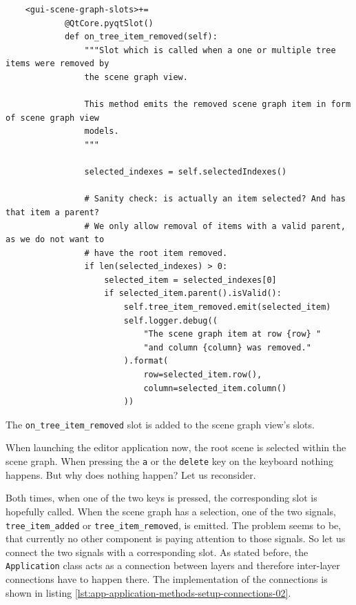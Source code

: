 \documentclass[10pt, openright, notitlepage]{scrreprt}
\begin{document}
\begin{listing}[H]
\begin{verbatim}
    <gui-scene-graph-slots>+=
            @QtCore.pyqtSlot()
            def on_tree_item_removed(self):
                """Slot which is called when a one or multiple tree items were removed by
                the scene graph view.
            
                This method emits the removed scene graph item in form of scene graph view
                models.
                """
            
                selected_indexes = self.selectedIndexes()
            
                # Sanity check: is actually an item selected? And has that item a parent?
                # We only allow removal of items with a valid parent, as we do not want to
                # have the root item removed.
                if len(selected_indexes) > 0:
                    selected_item = selected_indexes[0]
                    if selected_item.parent().isValid():
                        self.tree_item_removed.emit(selected_item)
                        self.logger.debug((
                            "The scene graph item at row {row} "
                            "and column {column} was removed."
                        ).format(
                            row=selected_item.row(),
                            column=selected_item.column()
                        ))
\end{verbatim}
\caption{\label{lst:gui-scene-graph-slots-on-tree-item-removed}
The \texttt{on\_tree\_item\_removed} slot is added to the scene graph view's slots.}
\end{listing}

When launching the editor application now, the root scene is selected within the
scene graph. When pressing the \texttt{a} or the \texttt{delete} key on the keyboard nothing
happens. But why does nothing happen? Let us reconsider.

Both times, when one of the two keys is pressed, the corresponding slot is
hopefully called. When the scene graph has a selection, one of the two signals,
\texttt{tree\_item\_added} or \texttt{tree\_item\_removed}, is emitted.
The problem seems to be, that currently no other component is paying attention
to those signals. So let us connect the two signals with a corresponding slot.
As stated before, the \texttt{Application} class acts as a connection between
layers and therefore inter-layer connections have to happen there. The
implementation of the connections is shown in listing
\ref{lst:app-application-methods-setup-connections-02}.
\end{document}
